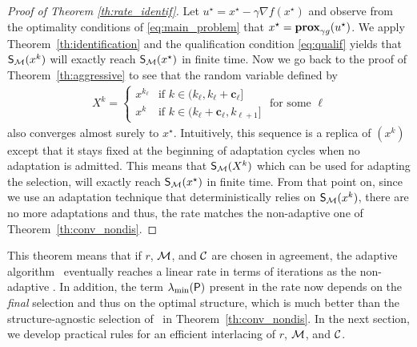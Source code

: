 \begin{proof}[Proof of Theorem \ref{th:rate_identif}]
Let $u^\star = x^\star-\gamma \nabla f(x^\star)$ and observe from the optimality conditions of \eqref{eq:main_problem} that $x^\star =  \prox_{\gamma g}(u^\star)$. We apply Theorem~\ref{th:identification} and the qualification condition \eqref{eq:qualif} yields that $\S(x^k)$ will exactly reach $\S(x^\star)$ in finite time. Now we go back to the proof of Theorem~\ref{th:aggressive} to see that the random variable defined by
\begin{align*}
    X^k = \left\{ \begin{array}{cl}
            x^{k_{\ell}} & \textrm{if } k\in(k_{\ell},k_{\ell}+\mathbf{c}_\ell]   \\
        x^k & \textrm{if } k\in(k_{\ell}+\mathbf{c}_\ell , k_{\ell+1}]  
    \end{array}\right. \textrm{ for some } \ell
\end{align*}
also converges almost surely to $x^\star$. Intuitively, this sequence is a replica of $(x^k)$ except that it stays fixed at the beginning of adaptation cycles when no adaptation is admitted. 
This means that $\S(X^k)$ which can be used for adapting the selection, will exactly reach $\S(x^\star)$ in finite time.
From that point on, since we use an adaptation technique that deterministically relies on $\S(x^k)$, there are no more adaptations and thus, the rate matches the non-adaptive one of Theorem~\ref{th:conv_nondis}.
\end{proof}

{
This theorem means that if $r$, $\M$, and $\C$ are chosen in agreement, the adaptive algorithm \adaalgo~eventually reaches a linear rate in terms of iterations as the non-adaptive \algo. In addition, the term $\lambda_{\min}(\bP)$ present in the rate now depends on the \emph{final} selection and thus on the optimal structure, which is much better than the structure-agnostic selection of \algo~in Theorem~\ref{th:conv_nondis}.  In the next section, we develop  practical rules for an efficient interlacing of $r$, $\M$, and $\C$. %
}


